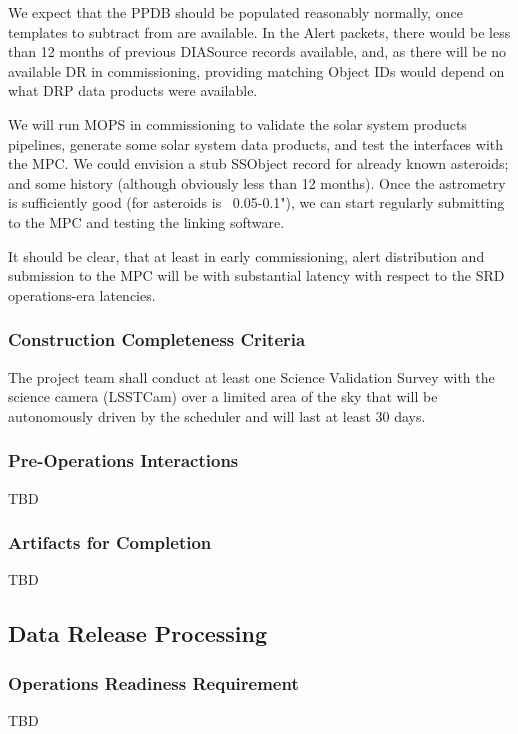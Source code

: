 We expect that the PPDB should be populated reasonably normally, once templates to subtract from are available.  In the Alert packets, there would be less than 12 months of previous DIASource records available, and, as there will be no available DR in commissioning, providing matching Object IDs would depend on what DRP data products were available. 

We will run MOPS in commissioning to validate the solar system products pipelines, generate some solar system data products, and test the interfaces with the MPC. We could envision a stub SSObject record for already known asteroids; and some history (although obviously less than 12 months). Once the astrometry is sufficiently good (for asteroids is ~0.05-0.1"),  we can start regularly submitting to the MPC and testing the linking software. 

It should be clear, that at least in early commissioning, alert distribution and submission to the MPC  will be with substantial latency with respect to the SRD operations-era latencies.  

\subsubsection{Construction Completeness Criteria}
The project team shall conduct at least one Science Validation Survey with the science camera (LSSTCam) over a limited area of the sky that will be autonomously driven by the scheduler and will last at least 30 days.

\subsubsection{Pre-Operations Interactions}
TBD

\subsubsection{Artifacts for Completion}
TBD


\subsection{Data Release Processing}

\subsubsection{Operations Readiness Requirement}
TBD


